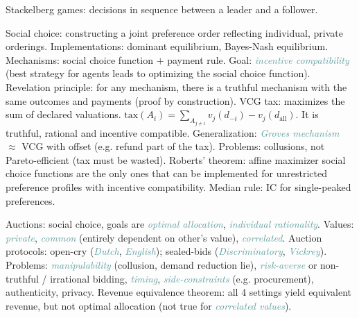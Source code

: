 \documentclass[10pt,a4paper,landscape]{article}
\newcommand{\concept}[1]{\textcolor{Emerald}{#1}} %
\newcommand{\subconcept}[1]{\textcolor{CadetBlue}{\textit{#1}}}
\renewcommand{\section}[1]{
  \vspace{-0.3cm}
  \begin{center}
    \color{Bittersweet}
    \hrulefill{\small~~#1~~}\hrulefill
  \end{center}
  \vspace{-0.3cm}
}
\renewcommand{\subsection}[1]{\section{#1}}
\begin{document}
\begin{multicols*}{4}
\concept{Stackelberg games}: decisions in sequence between a leader and a follower.

\subsection{Mechanism design}

\concept{Social choice}: constructing a joint preference order reflecting individual, private orderings. Implementations: dominant equilibrium, Bayes-Nash equilibrium.
\concept{Mechanisms}: social choice function $+$ payment rule. Goal: \subconcept{incentive compatibility} (best strategy for agents leads to optimizing the social choice function).
\concept{Revelation principle}: for any mechanism, there is a truthful mechanism with the same outcomes and payments (proof by construction).
\concept{VCG tax}: maximizes the sum of declared valuations. $\text{tax}(A_i) = \sum_{A_{j \neq i}} v_j(d_{-i}) - v_j(d_{\text{all}})$. It is truthful, rational and incentive compatible. Generalization: \subconcept{Groves mechanism} $\approx$ VCG with offset (e.g. refund part of the tax). Problems: collusions, not Pareto-efficient (tax must be wasted).
\concept{Roberts' theorem}: affine maximizer social choice functions are the only ones that can be implemented for unrestricted preference profiles with incentive compatibility.
\concept{Median rule}: IC for single-peaked preferences.

\subsection{Auctions}

\concept{Auctions}: social choice, goals are \subconcept{optimal allocation}, \subconcept{individual rationality}.
\concept{Values}: \subconcept{private}, \subconcept{common} (entirely dependent on other's value), \subconcept{correlated}.
\concept{Auction protocols}: open-cry (\subconcept{Dutch}, \subconcept{English}); sealed-bids (\subconcept{Discriminatory}, \subconcept{Vickrey}). Problems: \subconcept{manipulability} (collusion, demand reduction lie), \subconcept{risk-averse} or non-truthful / irrational bidding, \subconcept{timing}, \subconcept{side-constraints} (e.g. procurement), authenticity, privacy.
\concept{Revenue equivalence theorem}: all 4 settings yield equivalent revenue, but not optimal allocation (not true for \subconcept{correlated values}).


\end{multicols*}
\end{document}
